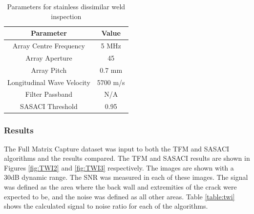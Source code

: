 \begin{table}[htbp!]
\begin{center}
	\begin{tabular}{| c | c |}
	\hline 
	\textbf{Parameter} & \textbf{Value} \\ \hline \hline 
	Array Centre Frequency	& 5 MHz \\ \hline
	Array Aperture & 45 \\ \hline
	Array Pitch & 0.7 mm \\ \hline
	Longitudinal Wave Velocity & 5700 m/s \\ \hline
 	Filter Passband & N/A \\ \hline
	SASACI Threshold & 0.95\\ \hline	
	\end{tabular}
	\caption{Parameters for stainless dissimilar weld inspection}
	\label{table:twi_setup}
	\end{center}
	\end{table}

\subsubsection{Results}

The Full Matrix Capture dataset was input to both the TFM and SASACI algorithms and the results compared. The TFM and SASACI results are shown in Figures \ref{fig:TWI2} and \ref{fig:TWI3} respectively. The images are shown with a 30dB dynamic range. The SNR was measured in each of these images. The signal was defined as the area where the back wall and extremities of the crack were expected to be, and the noise was defined as all other areas. Table \ref{table:twi} shows the calculated signal to noise ratio for each of the algorithms. 

